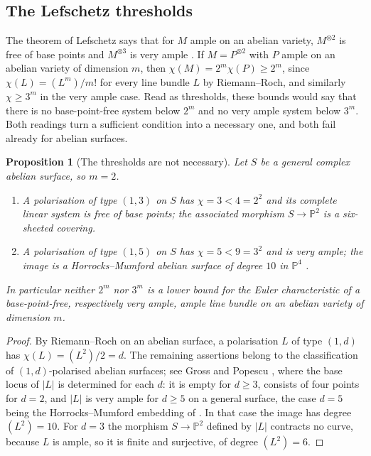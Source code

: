 \documentclass[11pt,reqno]{amsart}
\theoremstyle{plain}
\newtheorem{proposition}[theorem]{Proposition}
\theoremstyle{definition}
\theoremstyle{remark}
\newcommand{\PP}{\mathbb{P}}
\begin{document}
\subsection{The Lefschetz thresholds}

The theorem of Lefschetz says that for $M$ ample on an abelian variety,
$M^{\otimes2}$ is free of base points and $M^{\otimes3}$ is very ample
\cite[Section~4.5]{BL04}. If $M=P^{\otimes2}$ with $P$ ample on an abelian
variety of dimension $m$, then $\chi(M)=2^{m}\chi(P)\ge2^{m}$, since
$\chi(L)=(L^{m})/m!$ for every line bundle $L$ by Riemann--Roch, and similarly
$\chi\ge3^{m}$ in the very ample case. Read as thresholds, these bounds would
say that there is no base-point-free system below $2^{m}$ and no very ample
system below $3^{m}$. Both readings turn a sufficient condition into a
necessary one, and both fail already for abelian surfaces.

\begin{proposition}[The thresholds are not necessary]\label{prop:thresholds}
Let $S$ be a general complex abelian surface, so $m=2$.
\begin{enumerate}[label=\textup{(\roman*)},nosep]
\item A polarisation of type $(1,3)$ on $S$ has $\chi=3<4=2^{2}$ and its
  complete linear system is free of base points; the associated morphism
  $S\to\PP^{2}$ is a six-sheeted covering.
\item A polarisation of type $(1,5)$ on $S$ has $\chi=5<9=3^{2}$ and is very
  ample; the image is a Horrocks--Mumford abelian surface of degree $10$ in
  $\PP^{4}$ \textup{\cite{HM73}}.
\end{enumerate}
In particular neither $2^{m}$ nor $3^{m}$ is a lower bound for the Euler
characteristic of a base-point-free, respectively very ample, ample line
bundle on an abelian variety of dimension $m$.
\end{proposition}

\begin{proof}
By Riemann--Roch on an abelian surface, a polarisation $L$ of type $(1,d)$
has $\chi(L)=(L^{2})/2=d$. The remaining assertions belong to the
classification of $(1,d)$-polarised abelian surfaces; see Gross and Popescu
\cite[\S1.2]{GP98}, where the base locus of $|L|$ is determined for each $d$:
it is empty for $d\ge3$, consists of four points for $d=2$, and $|L|$ is very
ample for $d\ge5$ on a general surface, the case $d=5$ being the
Horrocks--Mumford embedding of \cite{HM73}. In that case the image has degree
$(L^{2})=10$. For $d=3$ the morphism $S\to\PP^{2}$ defined by $|L|$ contracts
no curve, because $L$ is ample, so it is finite and surjective, of degree
$(L^{2})=6$.
\end{proof}
\end{document}
